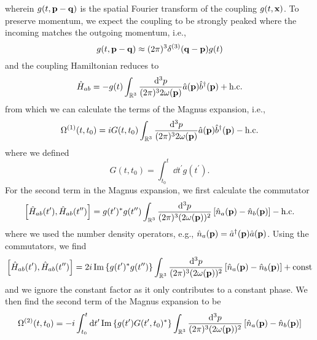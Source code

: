 wherein $g(t,\vb{p}-\vb{q})$ is the spatial Fourier transform of the coupling $g(t,\vb{x})$.
To preserve momentum, we expect the coupling to be strongly peaked where the incoming matches the outgoing momentum, i.e.,
\begin{equation}
	g(t,\vb{p}-\vb{q})
	\approx
	(2\pi)^3
	\delta^{(3)}(\vb{q}-\vb{p})
	g(t)
\end{equation}
and the coupling Hamiltonian reduces to
\begin{equation}
	\hat{H}_{ab}
	=
	-
	g(t)
	\int_{\mathbb{R}^3}
	\frac{\dd[3]{p}}{(2\pi)^32\omega(\vb{p})}
	\hat{a}(\vb{p})
	\hat{b}^\dagger(\vb{p})
	+
	\text{h.c.}
\end{equation}
from which we can calculate the terms of the Magnus expansion, i.e.,
\begin{equation}
	\Omega^{(1)}(t,t_0)
	=
	iG(t,t_0)
	\int_{\mathbb{R}^3}
	\frac{\dd[3]{p}}{(2\pi)^32\omega(\vb{p})}
	\hat{a}(\vb{p})
	\hat{b}^\dagger(\vb{p})
	-
	\text{h.c.}
\end{equation}
where we defined
\begin{equation}
	G(t,t_0)
	=
	\int_{t_0}^t
	\dd{t^\prime}
	g(t^\prime)
	.
\end{equation}
For the second term in the Magnus expansion, we first calculate the commutator
\begin{equation}
	\comm{\hat{H}_{ab}(t^\prime)}{\hat{H}_{ab}(t^{\prime\prime})}
	=
	g(t^\prime)^*
	g(t^{\prime\prime})
	\int_{\mathbb{R}^3}
	\frac{\dd[3]{p}}{(2\pi)^3(2\omega(\vb{p}))^2}
	\left[
		\hat{n}_a(\vb{p})
		-
		\hat{n}_b(\vb{p})
	\right]
	-
	\text{h.c.}
\end{equation}
where we used the number density operators, e.g., $\hat{n}_a(\vb{p})=\hat{a}^\dagger(\vb{p})\hat{a}(\vb{p})$.
Using the commutators, we find
\begin{equation}
	\comm{\hat{H}_{ab}(t^\prime)}{\hat{H}_{ab}(t^{\prime\prime})}
	=
	2i\Im\left\{
		g(t^\prime)^*
		g(t^{\prime\prime})
	\right\}
	\int_{\mathbb{R}^3}
	\frac{\dd[3]{p}}{(2\pi)^3(2\omega(\vb{p}))^2}
	\left[
		\hat{n}_a(\vb{p})
		-
		\hat{n}_b(\vb{p})
	\right]
	+
	\text{const}
\end{equation}
and we ignore the constant factor as it only contributes to a constant phase.
We then find the second term of the Magnus expansion to be
\begin{equation}
	\Omega^{(2)}(t,t_0)
	=
	-i
	\int_{t_0}^t
	\dd{t^\prime}
	\operatorname{\operatorname{Im}}\left\{
		g(t^\prime)
		G(t^\prime,t_0)^*
	\right\}
	\int_{\mathbb{R}^3}
	\frac{\dd[3]{p}}{(2\pi)^3(2\omega(\vb{p}))^2}
	\left[
		\hat{n}_a(\vb{p})
		-
		\hat{n}_b(\vb{p})
	\right]
\end{equation}
